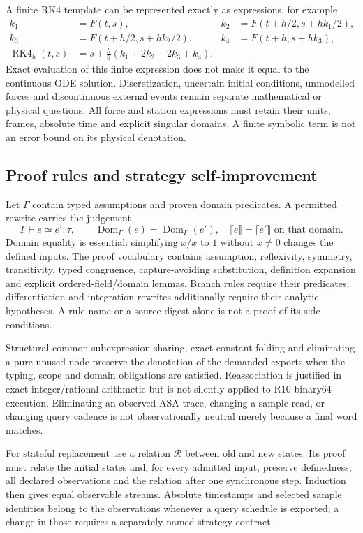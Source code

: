 A finite RK4 template can be represented exactly as expressions, for example
\begin{align*}
 k_1&=F(t,s),&k_2&=F(t+h/2,s+hk_1/2),\\
 k_3&=F(t+h/2,s+hk_2/2),&k_4&=F(t+h,s+hk_3),\\
 \operatorname{RK4}_h(t,s)&=s+\frac{h}{6}(k_1+2k_2+2k_3+k_4).
\end{align*}
Exact evaluation of this finite expression does not make it equal to the
continuous ODE solution. Discretization, uncertain initial conditions, unmodelled
forces and discontinuous external events remain separate mathematical or
physical questions. All force and station expressions must retain their units,
frames, absolute time and explicit singular domains. A finite symbolic term is
not an error bound on its physical denotation.

\subsection{Proof rules and strategy self-improvement}
Let $\Gamma$ contain typed assumptions and proven domain predicates. A permitted
rewrite carries the judgement
\[
 \Gamma\vdash e\simeq e':\tau,
 \qquad
 \operatorname{Dom}_{\Gamma}(e)=\operatorname{Dom}_{\Gamma}(e'),
 \quad \llbracket e\rrbracket=\llbracket e'\rrbracket
 \text{ on that domain}.
\]
Domain equality is essential: simplifying $x/x$ to $1$ without $x\ne0$ changes
the defined inputs. The proof vocabulary contains assumption, reflexivity,
symmetry, transitivity, typed congruence, capture-avoiding substitution,
definition expansion and explicit ordered-field/domain lemmas. Branch rules
require their predicates; differentiation and integration rewrites additionally
require their analytic hypotheses. A rule name or a source digest alone is not
a proof of its side conditions.

Structural common-subexpression sharing, exact constant folding and eliminating
a pure unused node preserve the denotation of the demanded exports when the
typing, scope and domain obligations are satisfied. Reassociation is justified
in exact integer/rational arithmetic but is not silently applied to R10 binary64
execution. Eliminating an observed ASA trace, changing a sample read, or changing
query cadence is not observationally neutral merely because a final word matches.

For stateful replacement use a relation $\mathcal R$ between old and new states.
Its proof must relate the initial states and, for every admitted input, preserve
definedness, all declared observations and the relation after one synchronous
step. Induction then gives equal observable streams. Absolute timestamps and
selected sample identities belong to the observations whenever a query schedule
is exported; a change in those requires a separately named strategy contract.

